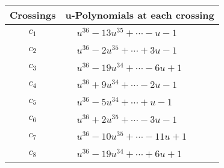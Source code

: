 \documentclass[1p]{elsarticle_modified}
\theoremstyle{definition}
\begin{document}
\begin{tabular}{m{50pt}|m{274pt}}
Crossings & \hspace{64pt}u-Polynomials at each crossing \\
\hline $$\begin{aligned}c_{1}\end{aligned}$$&$\begin{aligned}
&u^{36}-13 u^{35}+\cdots- u-1
\end{aligned}$\\
\hline $$\begin{aligned}c_{2}\end{aligned}$$&$\begin{aligned}
&u^{36}-2 u^{35}+\cdots+3 u-1
\end{aligned}$\\
\hline $$\begin{aligned}c_{3}\end{aligned}$$&$\begin{aligned}
&u^{36}-19 u^{34}+\cdots-6 u+1
\end{aligned}$\\
\hline $$\begin{aligned}c_{4}\end{aligned}$$&$\begin{aligned}
&u^{36}+9 u^{34}+\cdots-2 u-1
\end{aligned}$\\
\hline $$\begin{aligned}c_{5}\end{aligned}$$&$\begin{aligned}
&u^{36}-5 u^{34}+\cdots+u-1
\end{aligned}$\\
\hline $$\begin{aligned}c_{6}\end{aligned}$$&$\begin{aligned}
&u^{36}+2 u^{35}+\cdots-3 u-1
\end{aligned}$\\
\hline $$\begin{aligned}c_{7}\end{aligned}$$&$\begin{aligned}
&u^{36}-10 u^{35}+\cdots-11 u+1
\end{aligned}$\\
\hline $$\begin{aligned}c_{8}\end{aligned}$$&$\begin{aligned}
&u^{36}-19 u^{34}+\cdots+6 u+1
\end{aligned}$\\

\end{tabular}
\end{document}

